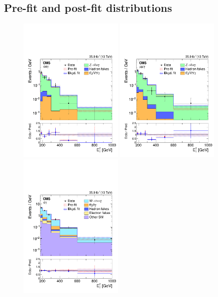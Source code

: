 \subsection{Pre-fit and post-fit distributions}
\label{subsec:distributions}

\begin{figure}[htbp]
  \centering
    \includegraphics[width=0.45\textwidth]{Analysis/Figures/bonly_diel.pdf}
    \includegraphics[width=0.45\textwidth]{Analysis/Figures/bonly_dimu.pdf}
    \includegraphics[width=0.45\textwidth]{Analysis/Figures/bonly_monoel.pdf}

\end{figure}
